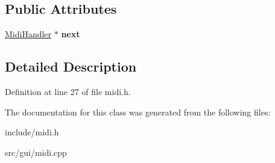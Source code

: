 \subsection*{Public Attributes}
\begin{DoxyCompactItemize}
\item 
\hypertarget{classMidiHandler_a32f0f5cac10b1b566ffa969826b6cf99}{\hyperlink{classMidiHandler}{Midi\-Handler} $\ast$ {\bfseries next}}\label{classMidiHandler_a32f0f5cac10b1b566ffa969826b6cf99}

\end{DoxyCompactItemize}


\subsection{Detailed Description}


Definition at line 27 of file midi.\-h.



The documentation for this class was generated from the following files\-:\begin{DoxyCompactItemize}
\item 
include/midi.\-h\item 
src/gui/midi.\-cpp\end{DoxyCompactItemize}

